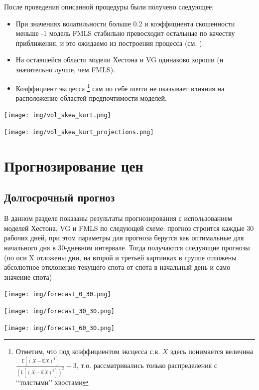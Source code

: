 \documentclass[oneside, final, 12pt, a4paper]{article}
\begin{document}
После проведения описанной процедуры были получено следующее:
\begin{itemize}
\item При значениях волатильности больше 0.2 и коэффициента скошенности меньше -1 модель FMLS стабильно превосходит остальные по качеству приближения, и это ожидаемо из построения процесса (см. \cite{LS:paper}). 
\item На оставшейся области модели Хестона и VG одинаково хороши (и значительно лучше, чем FMLS). 
\item Коэффициент эксцесса \footnote{Отметим, что под коэффициентом эксцесса с.в. $X$ здесь понимается величина \( \frac{\mathbb{E}[(X - \mathbb{E}X)^4]}{(\mathbb{E}[(X - \mathbb{E}X)^2])^2} - 3 \), т.о. рассматривались только распределения с \lq\lq{}толстыми\rq\rq{} хвостами}
 сам по себе почти не оказывает влияния на расположение областей предпочтимости моделей.
\end{itemize}

\begin{center}
  \texttt{[image: img/vol\_skew\_kurt.png]}
\end{center}

\begin{center}
  \texttt{[image: img/vol\_skew\_kurt\_projections.png]}
\end{center}


\newpage
\section{Прогнозирование цен}
\label{forecast:label}
\subsection{Долгосрочный прогноз}
В данном разделе показаны результаты прогнозирования с использованием моделей Хестона, VG  и FMLS по следующей схеме: прогноз строится каждые 30 рабочих дней, при этом параметры для прогноза берутся как оптимальные для начального дня в 30-дневном интервале. Тогда получаются следующие прогнозы (по оси X отложены дни, на второй и третьей картинках в группе отложены абсолютное отклонение текущего спота от спота в начальный день и само значение спота)

\begin{center}
  \texttt{[image: img/forecast\_0\_30.png]}
\end{center}

\begin{center}
  \texttt{[image: img/forecast\_30\_30.png]}
\end{center}
\begin{center}
  \texttt{[image: img/forecast\_60\_30.png]}
\end{center}
\end{document}
